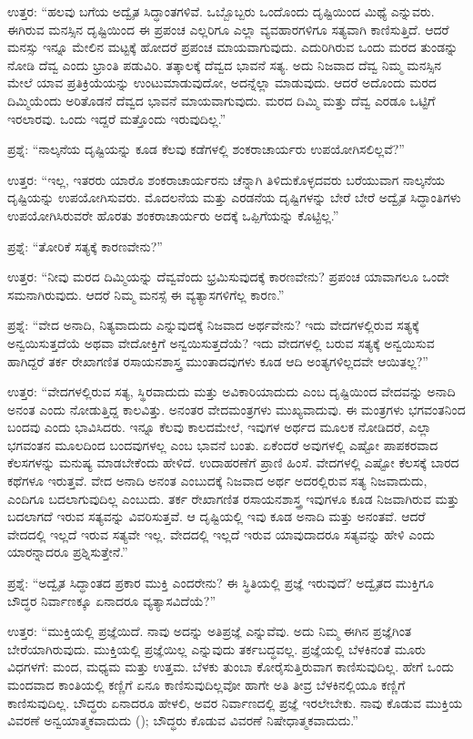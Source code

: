  ಉತ್ತರ: “ಹಲವು ಬಗೆಯ ಅದ್ವೈತ ಸಿದ್ಧಾಂತಗಳಿವೆ. ಒಬ್ಬೊಬ್ಬರು ಒಂದೊಂದು ದೃಷ್ಟಿಯಿಂದ ಮಿಥ್ಯೆ ಎನ್ನುವರು. ಈಗಿರುವ ಮನಸ್ಸಿನ ದೃಷ್ಟಿಯಿಂದ ಈ ಪ್ರಪಂಚ ಎಲ್ಲರಿಗೂ ಎಲ್ಲಾ ವ್ಯವಹಾರಗಳಿಗೂ ಸತ್ಯವಾಗಿ ಕಾಣಿಸುತ್ತಿದೆ. ಆದರೆ ಮನಸ್ಸು ಇನ್ನೂ ಮೇಲಿನ ಮಟ್ಟಕ್ಕೆ ಹೋದರೆ ಪ್ರಪಂಚ ಮಾಯವಾಗುವುದು. ಎದುರಿಗಿರುವ ಒಂದು ಮರದ ತುಂಡನ್ನು ನೋಡಿ ದೆವ್ವ ಎಂದು ಭ್ರಾಂತಿ ಪಡುವಿರಿ. ತತ್ಕಾಲಕ್ಕೆ ದೆವ್ವದ ಭಾವನೆ ಸತ್ಯ. ಅದು ನಿಜವಾದ ದೆವ್ವ ನಿಮ್ಮ ಮನಸ್ಸಿನ ಮೇಲೆ ಯಾವ ಪ್ರತಿಕ್ರಿಯೆಯನ್ನು ಉಂಟುಮಾಡುವುದೋ, ಅದನ್ನೆಲ್ಲಾ ಮಾಡುವುದು. ಆದರೆ ಅದೊಂದು ಮರದ ದಿಮ್ಮಿಯೆಂದು ಅರಿತೊಡನೆ ದೆವ್ವದ ಭಾವನೆ ಮಾಯವಾಗುವುದು. ಮರದ ದಿಮ್ಮಿ ಮತ್ತು ದೆವ್ವ ಎರಡೂ ಒಟ್ಟಿಗೆ ಇರಲಾರವು. ಒಂದು ಇದ್ದರೆ ಮತ್ತೊಂದು ಇರುವುದಿಲ್ಲ.” 

 ಪ್ರಶ್ನೆ: “ನಾಲ್ಕನೆಯ ದೃಷ್ಟಿಯನ್ನು ಕೂಡ ಕೆಲವು ಕಡೆಗಳಲ್ಲಿ ಶಂಕರಾಚಾರ್ಯರು ಉಪಯೋಗಿಸಲಿಲ್ಲವೆ?” 

 ಉತ್ತರ: “ಇಲ್ಲ, ಇತರರು ಯಾರೊ ಶಂಕರಾಚಾರ್ಯರನು ಚೆನ್ನಾಗಿ ತಿಳಿದುಕೊಳ್ಳದವರು ಬರೆಯುವಾಗ ನಾಲ್ಕನೆಯ ದೃಷ್ಟಿಯನ್ನು ಉಪಯೋಗಿಸುವರು. ಮೊದಲನೆಯ ಮತ್ತು ಎರಡನೆಯ ದೃಷ್ಟಿಗಳನ್ನು ಬೇರೆ ಬೇರೆ ಅದ್ವೈತ ಸಿದ್ಧಾಂತಿಗಳು ಉಪಯೋಗಿಸಿರುವರೇ ಹೊರತು ಶಂಕರಾಚಾರ್ಯರು ಅದಕ್ಕೆ ಒಪ್ಪಿಗೆಯನ್ನು ಕೊಟ್ಟಿಲ್ಲ.” 

 ಪ್ರಶ್ನೆ: “ತೋರಿಕೆ ಸತ್ಯಕ್ಕೆ ಕಾರಣವೇನು?” 

 ಉತ್ತರ: “ನೀವು ಮರದ ದಿಮ್ಮಿಯನ್ನು ದೆವ್ವವೆಂದು ಭ್ರಮಿಸುವುದಕ್ಕೆ ಕಾರಣವೇನು? ಪ್ರಪಂಚ ಯಾವಾಗಲೂ ಒಂದೇ ಸಮನಾಗಿರುವುದು. ಆದರೆ ನಿಮ್ಮ ಮನಸ್ಸೆ ಈ ವ್ಯತ್ಯಾಸಗಳಿಗೆಲ್ಲ ಕಾರಣ.” 

 ಪ್ರಶ್ನೆ: “ವೇದ ಅನಾದಿ, ನಿತ್ಯವಾದುದು ಎನ್ನುವುದಕ್ಕೆ ನಿಜವಾದ ಅರ್ಥವೇನು? ಇದು ವೇದಗಳಲ್ಲಿರುವ ಸತ್ಯಕ್ಕೆ ಅನ್ವಯಿಸುತ್ತದೆಯೆ ಅಥವಾ ವೇದೋಕ್ತಿಗೆ ಅನ್ವಯಿಸುತ್ತದೆಯೆ? ಇದು ವೇದಗಳಲ್ಲಿ ಬರುವ ಸತ್ಯಕ್ಕೆ ಅನ್ವಯಿಸುವ ಹಾಗಿದ್ದರೆ ತರ್ಕ ರೇಖಾಗಣಿತ ರಸಾಯನಶಾಸ್ತ್ರ ಮುಂತಾದವುಗಳು ಕೂಡ ಆದಿ ಅಂತ್ಯಗಳಿಲ್ಲದವೇ ಆಯಿತಲ್ಲ?” 

 ಉತ್ತರ: “ವೇದಗಳಲ್ಲಿರುವ ಸತ್ಯ, ಸ್ಥಿರವಾದುದು ಮತ್ತು ಅವಿಕಾರಿಯಾದುದು ಎಂಬ ದೃಷ್ಟಿಯಿಂದ ವೇದವನ್ನು ಅನಾದಿ ಅನಂತ ಎಂದು ನೋಡುತ್ತಿದ್ದ ಕಾಲವಿತ್ತು. ಅನಂತರ ವೇದಮಂತ್ರಗಳು ಮುಖ್ಯವಾದುವು. ಈ ಮಂತ್ರಗಳು ಭಗವಂತನಿಂದ ಬಂದವು ಎಂದು ಭಾವಿಸಿದರು. ಇನ್ನೂ ಕೆಲವು ಕಾಲದಮೇಲೆ, ಇವುಗಳ ಅರ್ಥದ ಮೂಲಕ ನೋಡಿದರೆ, ಎಲ್ಲಾ ಭಗವಂತನ ಮೂಲದಿಂದ ಬಂದವುಗಳಲ್ಲ ಎಂಬ ಭಾವನೆ ಬಂತು. ಏಕೆಂದರೆ ಅವುಗಳಲ್ಲಿ ಎಷ್ಟೋ ಪಾಪಕರವಾದ ಕೆಲಸಗಳನ್ನು ಮನುಷ್ಯ ಮಾಡಬೇಕೆಂದು ಹೇಳಿದೆ. ಉದಾಹರಣೆಗೆ ಪ್ರಾಣಿ ಹಿಂಸೆ. ವೇದಗಳಲ್ಲಿ ಎಷ್ಟೋ ಕೆಲಸಕ್ಕೆ ಬಾರದ ಕಥೆಗಳೂ ಇರುತ್ತವೆ. ವೇದ ಅನಾದಿ ಅನಂತ ಎಂಬುದಕ್ಕೆ ನಿಜವಾದ ಅರ್ಥ ಅದರಲ್ಲಿರುವ ಸತ್ಯ ನಿಜವಾದುದು, ಎಂದಿಗೂ ಬದಲಾಗುವುದಿಲ್ಲ ಎಂಬುದು. ತರ್ಕ ರೇಖಾಗಣಿತ ರಸಾಯನಶಾಸ್ತ್ರ ಇವುಗಳೂ ಕೂಡ ನಿಜವಾಗಿರುವ ಮತ್ತು ಬದಲಾಗದೆ ಇರುವ ಸತ್ಯವನ್ನು ವಿವರಿಸುತ್ತವೆ. ಆ ದೃಷ್ಟಿಯಲ್ಲಿ ಇವು ಕೂಡ ಅನಾದಿ ಮತ್ತು ಅನಂತವೆ. ಆದರೆ ವೇದದಲ್ಲಿ ಇಲ್ಲದೆ ಇರುವ ಸತ್ಯವೇ ಇಲ್ಲ. ವೇದದಲ್ಲಿ ಇಲ್ಲದೆ ಇರುವ ಯಾವುದಾದರೂ ಸತ್ಯವನ್ನು ಹೇಳಿ ಎಂದು ಯಾರನ್ನಾದರೂ ಪ್ರಶ್ನಿಸುತ್ತೇನೆ.” 

 ಪ್ರಶ್ನೆ: “ಅದ್ವೈತ ಸಿದ್ಧಾಂತದ ಪ್ರಕಾರ ಮುಕ್ತಿ ಎಂದರೇನು? ಈ ಸ್ಥಿತಿಯಲ್ಲಿ ಪ್ರಜ್ಞೆ ಇರುವುದೆ? ಅದ್ವೈತದ ಮುಕ್ತಿಗೂ ಬೌದ್ಧರ ನಿರ್ವಾಣಕ್ಕೂ ಏನಾದರೂ ವ್ಯತ್ಯಾಸವಿದೆಯೆ?” 

 ಉತ್ತರ: “ಮುಕ್ತಿಯಲ್ಲಿ ಪ್ರಜ್ಞೆಯಿದೆ. ನಾವು ಅದನ್ನು ಅತಿಪ್ರಜ್ಞೆ ಎನ್ನುವೆವು. ಅದು ನಿಮ್ಮ ಈಗಿನ ಪ್ರಜ್ಞೆಗಿಂತ ಬೇರೆಯಾಗಿರುವುದು. ಮುಕ್ತಿಯಲ್ಲಿ ಪ್ರಜ್ಞೆಯಿಲ್ಲ ಎನ್ನುವುದು ತರ್ಕಬದ್ಧವಲ್ಲ. ಪ್ರಜ್ಞೆಯಲ್ಲಿ ಬೆಳಕಿನಂತೆ ಮೂರು ವಿಧಗಳಗೆ: ಮಂದ, ಮಧ್ಯಮ ಮತ್ತು ಉತ್ತಮ. ಬೆಳಕು ತುಂಬಾ ಕೋರೈಸುತ್ತಿರುವಾಗ ಕಾಣಿಸುವುದಿಲ್ಲ. ಹೇಗೆ ಒಂದು ಮಂದವಾದ ಕಾಂತಿಯಲ್ಲಿ ಕಣ್ಣಿಗೆ ಏನೂ ಕಾಣಿಸುವುದಿಲ್ಲವೋ ಹಾಗೇ ಅತಿ ತೀವ್ರ ಬೆಳಕಿನಲ್ಲಿಯೂ ಕಣ್ಣಿಗೆ ಕಾಣಿಸುವುದಿಲ್ಲ. ಬೌದ್ಧರು ಏನಾದರೂ ಹೇಳಲಿ, ಅವರ ನಿರ್ವಾಣದಲ್ಲಿ ಪ್ರಜ್ಞೆ ಇರಲೇಬೇಕು. ನಾವು ಕೊಡುವ ಮುಕ್ತಿಯ ವಿವರಣೆ ಅನ್ವಯಾತ್ಮಕವಾದುದು (); ಬೌದ್ಧರು ಕೊಡುವ ವಿವರಣೆ ನಿಷೇಧಾತ್ಮಕವಾದುದು.” 

